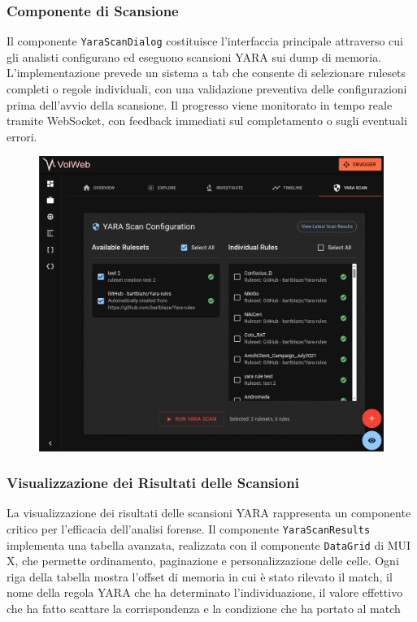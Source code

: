 \subsubsection{Componente di Scansione}

Il componente \texttt{YaraScanDialog} costituisce l’interfaccia principale attraverso cui gli analisti configurano ed eseguono scansioni YARA sui dump di memoria. L’implementazione prevede un sistema a tab che consente di selezionare rulesets completi o regole individuali, con una validazione preventiva delle configurazioni prima dell’avvio della scansione. Il progresso viene monitorato in tempo reale tramite WebSocket, con feedback immediati sul completamento o sugli eventuali errori.

\begin{figure}[H]
\centering
\includegraphics[width=1\linewidth]{images/volweb-esteso/volweb-scanview.png}
\end{figure}

\subsubsection{Visualizzazione dei Risultati delle Scansioni}
La visualizzazione dei risultati delle scansioni YARA rappresenta un componente critico per l'efficacia dell'analisi forense. Il componente \texttt{YaraScanResults} implementa una tabella avanzata, realizzata con il componente \texttt{DataGrid} di MUI X, che permette ordinamento, paginazione e personalizzazione delle celle. Ogni riga della tabella mostra l’offset di memoria in cui è stato rilevato il match, il nome della regola YARA che ha determinato l’individuazione, il valore effettivo che ha fatto scattare la corrispondenza e la condizione che ha portato al match

